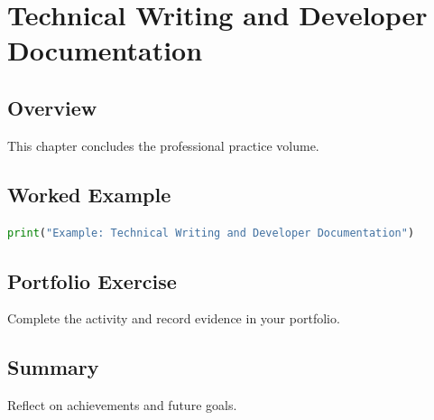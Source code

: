\chapter{Technical Writing and Developer Documentation}
\label{chap:vol15-6}



\section{Overview}
This chapter concludes the professional practice volume.

\section{Worked Example}
\begin{lstlisting}[language=Python]
print("Example: Technical Writing and Developer Documentation")
\end{lstlisting}

\section{Portfolio Exercise}
Complete the activity and record evidence in your portfolio.

\section{Summary}
Reflect on achievements and future goals.
